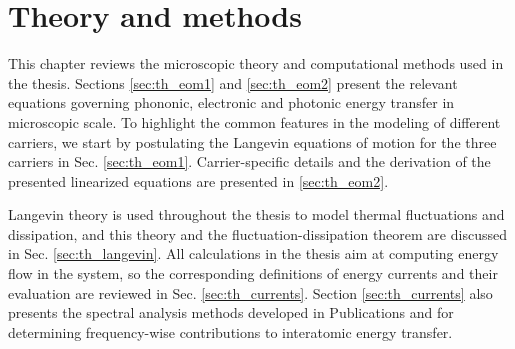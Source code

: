 \chapter{Theory and methods}
\label{chap:theory}
% 


This chapter reviews the microscopic theory and computational methods used in the thesis. Sections \ref{sec:th_eom1} and \ref{sec:th_eom2} present the relevant equations governing phononic, electronic and photonic energy transfer in microscopic scale. To highlight the common features in the modeling of different carriers, we start by postulating the Langevin equations of motion for the three carriers in Sec. \ref{sec:th_eom1}. Carrier-specific details and the derivation of the presented linearized equations are presented in \ref{sec:th_eom2}. 

Langevin theory is used throughout the thesis to model thermal fluctuations and dissipation, and this theory and the fluctuation-dissipation theorem are discussed in Sec. \ref{sec:th_langevin}. All calculations in the thesis aim at computing energy flow in the system, so the corresponding definitions of energy currents and their evaluation are reviewed in Sec. \ref{sec:th_currents}. Section \ref{sec:th_currents} also presents the spectral analysis methods developed in Publications  and  for determining frequency-wise contributions to interatomic energy transfer. 



